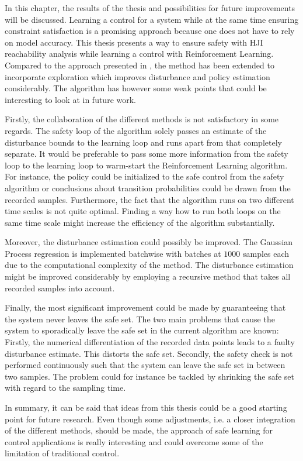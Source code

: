\documentclass[../main.tex]{subfiles}
\begin{document}
In this chapter, the results of the thesis and possibilities for future improvements will be discussed. Learning a control for a system while at the same time ensuring constraint satisfaction is a promising approach because one does not have to rely on model accuracy. This thesis presents a way to ensure safety with HJI reachability analysis while learning a control with Reinforcement Learning. Compared to the approach presented in \cite{akametalu2014reachability}, the method has been extended to incorporate exploration which improves disturbance and policy estimation considerably. The algorithm has however some weak points that could be interesting to look at in future work. \par
Firstly, the collaboration of the different methods is not satisfactory in some regards. The safety loop of the algorithm solely passes an estimate of the disturbance bounds to the learning loop and runs apart from that completely separate. It would be preferable to pass some more information from the safety loop to the learning loop to warm-start the Reinforcement Learning algorithm. For instance, the policy could be initialized to the safe control from the safety algorithm or conclusions about transition probabilities could be drawn from the recorded samples. Furthermore, the fact that the algorithm runs on two different time scales is not quite optimal. Finding a way how to run both loops on the same time scale might increase the efficiency of the algorithm substantially.\par
Moreover, the disturbance estimation could possibly be improved. The Gaussian Process regression is implemented batchwise with batches at $1000$ samples each due to the computational complexity of the method. The disturbance estimation might be improved considerably by employing a recursive method that takes all recorded samples into account. \par
Finally, the most significant improvement could be made by guaranteeing that the system never leaves the safe set. The two main problems that cause the system to sporadically leave the safe set in the current algorithm are known: Firstly, the numerical differentiation of the recorded data points leads to a faulty disturbance estimate. This distorts the safe set. Secondly, the safety check is not performed continuously such that the system can leave the safe set in between two samples. The problem could for instance be tackled by shrinking the safe set with regard to the sampling time.\par
In summary, it can be said that ideas from this thesis could be a good starting point for future research. Even though some adjustments, i.e. a closer integration of the different methods, should be made, the approach of safe learning for control applications is really interesting and could overcome some of the limitation of traditional control.
\end{document}
